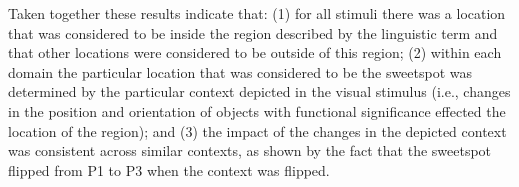 \documentclass[11pt,letterpaper]{article}
\begin{document}



Taken together these results indicate that: (1) for all stimuli there was a location that was considered to be inside the region described by the linguistic term and that other locations were considered to be outside of this region; (2) within each domain the particular location that was considered to be the sweetspot was determined by the particular context depicted in the visual stimulus (i.e., changes in the position and orientation of objects with functional significance effected the location of the region); and (3) the impact of the changes in the depicted context was consistent across similar contexts, as shown by the fact that the sweetspot flipped from P1 to P3 when the context was flipped.
\end{document}
